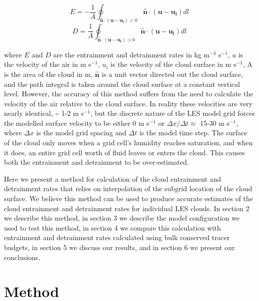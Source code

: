 \documentclass[12pt]{article}
\begin{document}
\begin{equation}
E = -\frac{1}{A}\oint_{\mathbf{\hat{n}}\cdot(\mathbf{u} - \mathbf{u_i}) < 0}
\mathbf{\hat{n}}\cdot(\mathbf{u}-\mathbf{u_i})dl
\end{equation}
\begin{equation}
D = \frac{1}{A}\oint_{\mathbf{\hat{n}}\cdot(\mathbf{u} - \mathbf{u_i}) > 0}
\mathbf{\hat{n}}\cdot(\mathbf{u}-\mathbf{u_i})dl
\end{equation}

where $E$ and $D$ are the entrainment and detrainment rates in kg 
m$^{-3}$ s$^{-1}$, $u$ is the velocity of the air in m s$^{-1}$, $u_i$ is the 
velocity of the cloud surface in m s$^{-1}$, A is the area of the cloud in m,
$\mathbf{\hat{n}}$ is a unit vector directed out the cloud surface, and the 
path integral is taken around the cloud surface at a constant vertical level.
However, the accuracy of this method suffers from the need to calculate the 
velocity of the air relative to the cloud surface.  In reality these velocities 
are very nearly identical, \textasciitilde{} 1-2 m s$^{-1}$, but the discrete 
nature of the LES model grid forces the modelled surface velocity to be either 
0 m s$^{-1}$ or $\Delta x / \Delta t \approx$ 15-30 m s$^{-1}$, where 
$\Delta x$ is the model grid spacing and $\Delta t$ is the model time step.  The
surface of the cloud only moves when a grid cell's humidity reaches saturation, 
and when it does, an entire grid cell worth of fluid leaves or enters the cloud.
This causes both the entrainment and detrainment to be over-estimated.

Here we present a method for calculation of the cloud entrainment and 
detrainment rates that relies on interpolation of the subgrid location 
of the cloud surface.  We believe this method can be used to produce accurate
estimates of the cloud entrainment and detrainment rates for individual LES
clouds.  In section 2 we describe this method, in section 3 we describe the 
model configuration we used to test this method, in section 4 we compare this
calculation with entrainment and detrainment rates calculated using bulk
conserved tracer budgets, in section 5 we discuss our results, and in section 6
we present our conclusions.  


\section{Method}
\end{document}
